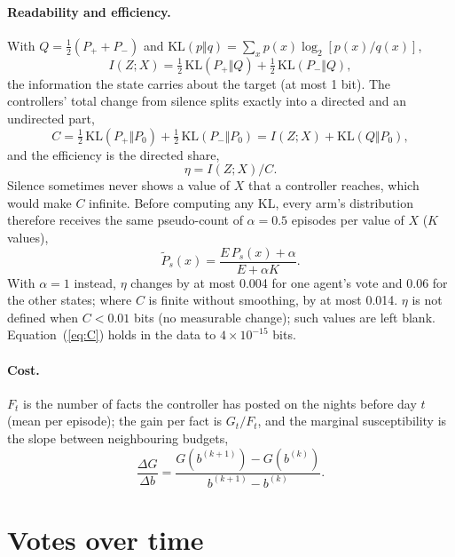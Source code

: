\documentclass[10pt,a4paper]{article}
\begin{document}
\paragraph{Readability and efficiency.} With $Q = \frac12(P_+ + P_-)$ and $\mathrm{KL}(p\Vert q) = \sum_x p(x)\log_2[p(x)/q(x)]$,
\begin{equation}\label{eq:I}
I(Z;X) = \tfrac12\,\mathrm{KL}(P_+\Vert Q) + \tfrac12\,\mathrm{KL}(P_-\Vert Q),
\end{equation}
the information the state carries about the target (at most 1 bit). The controllers' total change from silence
splits exactly into a directed and an undirected part,
\begin{equation}\label{eq:C}
C = \tfrac12\,\mathrm{KL}(P_+\Vert P_0) + \tfrac12\,\mathrm{KL}(P_-\Vert P_0) = I(Z;X) + \mathrm{KL}(Q\Vert P_0),
\end{equation}
and the efficiency is the directed share,
\begin{equation}\label{eq:eta}
\eta = I(Z;X)/C .
\end{equation}
Silence sometimes never shows a value of $X$ that a controller reaches, which would make $C$ infinite. Before
computing any KL, every arm's distribution therefore receives the same pseudo-count of $\alpha = 0.5$ episodes per
value of $X$ ($K$ values),
\begin{equation}\label{eq:smooth}
\tilde P_s(x) = \frac{E\,P_s(x) + \alpha}{E + \alpha K}.
\end{equation}
With $\alpha = 1$ instead, $\eta$ changes by at most 0.004 for one agent's vote and 0.06 for the other states; where
$C$ is finite without smoothing, by at most 0.014. $\eta$ is not defined when $C < 0.01$ bits (no measurable change);
such values are left blank. Equation~(\ref{eq:C}) holds in the data to $4\times10^{-15}$ bits.

\paragraph{Cost.} $F_t$ is the number of facts the controller has posted on the nights before day $t$ (mean per
episode); the gain per fact is $G_t/F_t$, and the marginal susceptibility is the slope between neighbouring
budgets,
\begin{equation}\label{eq:slope}
\frac{\Delta G}{\Delta b} = \frac{G(b^{(k+1)}) - G(b^{(k)})}{b^{(k+1)} - b^{(k)}} .
\end{equation}

\section{Votes over time}
\end{document}
